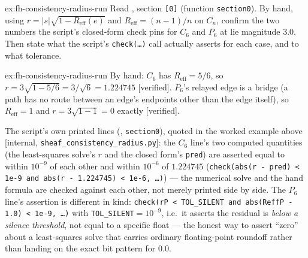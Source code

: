 \documentclass[11pt,a4paper]{article}
\theoremstyle{definition}
\theoremstyle{remark}
\begin{document}
\begin{pdexercise}[kind=Trace,rating=2]{ex:fh-consistency-radius-run}
Read , section \texttt{[0]} (function \texttt{section0}). By hand, using $r=|s|\sqrt{1-R_{\mathrm{eff}}(e)}$ and $R_{\mathrm{eff}}=(n-1)/n$ on $C_n$, confirm the two numbers the script's closed-form check pins for $C_6$ and $P_6$ at lie magnitude $3.0$. Then state what the script's \texttt{check(\ldots)} call actually asserts for each case, and to what tolerance.
\end{pdexercise}
\begin{pdsolution}{ex:fh-consistency-radius-run}
By hand: $C_6$ has $R_{\mathrm{eff}}=5/6$, so $r=3\sqrt{1-5/6}=3/\sqrt6=1.224745$ [verified]. $P_6$'s relayed edge is a bridge (a path has no route between an edge's endpoints other than the edge itself), so $R_{\mathrm{eff}}=1$ and $r=3\sqrt{1-1}=0$ exactly [verified].

The script's own printed lines (, \texttt{section0}), quoted in the worked example above [internal, \texttt{sheaf\_consistency\_radius.py}]: the $C_6$ line's two computed quantities (the least-squares solve's $r$ and the closed form's \texttt{pred}) are asserted equal to within $10^{-9}$ of each other and within $10^{-6}$ of $1.224745$ (\texttt{check(abs(r - pred) < 1e-9 and abs(r - 1.224745) < 1e-6, \ldots)}) --- the numerical solve and the hand formula are checked against each other, not merely printed side by side. The $P_6$ line's assertion is different in kind: \texttt{check(rP < TOL\_SILENT and abs(ReffP - 1.0) < 1e-9, \ldots)} with \texttt{TOL\_SILENT}$=10^{-9}$, i.e.\ it asserts the residual is \emph{below a silence threshold}, not equal to a specific float --- the honest way to assert ``zero'' about a least-squares solve that carries ordinary floating-point roundoff rather than landing on the exact bit pattern for $0.0$.
\end{pdsolution}
\end{document}
